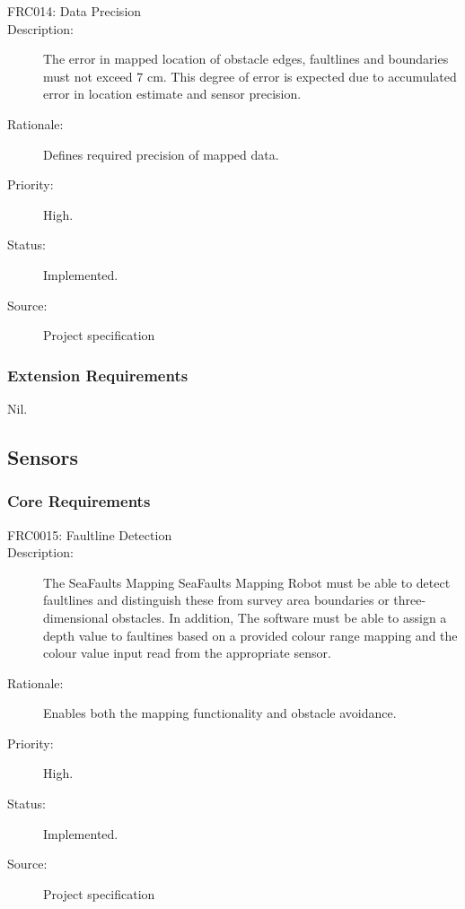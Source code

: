 \documentclass[12pt]{article}
\begin{document}
\begin{description}
\item [{FRC014: Data Precision}\label{FRC014}] 
\item [{Description: }\label{Description}] The error in mapped location of obstacle edges, faultlines and boundaries must not exceed 7 cm. This degree of error is expected due to accumulated error in location estimate and sensor precision. 
\item[{Rationale: }\label{Rationale}] Defines required precision of mapped data.
\item[{Priority: }\label{Priority}] High.
\item[{Status: }\label{Status}] Implemented.
\item[{Source: }\label{Source}] Project specification \cite{spec}

\end{description}

\subsubsection{Extension Requirements}
Nil.

\subsection{Sensors}

\subsubsection{Core Requirements}
\begin{description}
\item [{FRC0015: Faultline Detection}\label{FRC015}] 
\item [{Description: }\label{Description}] The SeaFaults Mapping SeaFaults Mapping Robot must be able to detect faultlines and distinguish these from survey area boundaries or three-dimensional obstacles.  In addition, The software must be able to assign a depth value to faultines based on a provided colour range mapping and the colour value input read from the appropriate sensor.
\item[{Rationale: }\label{Rationale}] Enables both the mapping functionality and obstacle avoidance.
\item[{Priority: }\label{Priority}] High.
\item[{Status: }\label{Status}] Implemented.
\item[{Source: }\label{Source}] Project specification \cite{spec}
\end{description}
\end{document}
